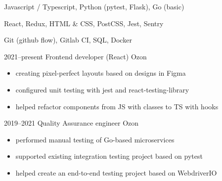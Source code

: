 \documentclass[9pt]{developercv} %
\begin{document}
\vspace{10px}

\medskip

	\vspace{-\baselineskip}
	
	\medskip
	
	  {\large Javascript / Typescript, Python (pytest, Flask), Go (basic)} 
	
	\divider
	
	 {\large React, Redux, HTML \& CSS, PostCSS, Jest, Sentry} 
	
	\divider
	
	 {\large Git (github flow), Gitlab CI, SQL, Docker} 

\vspace{15px}

\medskip
\begin{entrylist}
	\entry
		{2021--present}
		{\Large Frontend developer (React)}
		{\Large \faMapMarker \hspace{1px} Ozon\\}
		{\large
			\vspace{-30px}
			
			\begin{itemize}
				\item creating pixel-perfect layouts based on designs in Figma
				
				\item configured unit testing with jest and react-testing-library
				
				\item helped refactor components from JS with classes to TS with hooks
			
			\end{itemize}
			
			\vspace{-5px}
		}
		
	\entry
		{2019--2021}
		{\Large Quality Assurance engineer}
		{\Large \faMapMarker \hspace{1px} Ozon\\}
		{\large 
			\vspace{-30px}
			
			\begin{itemize}
				\item performed manual testing of Go-based microservices
				
				\item supported existing integration testing project based on pytest
				
				\item helped create an end-to-end testing project based on WebdriverIO
			
			\end{itemize}
			
			\vspace{-5px}
		}
\end{entrylist}
\end{document}
